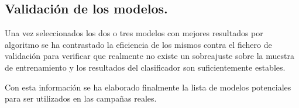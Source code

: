 \subsection{Validación de los modelos.}

Una vez seleccionados los dos o tres modelos con mejores resultados por algoritmo se ha contrastado la eficiencia de los mismos contra el fichero de validación para verificar que realmente no existe un sobreajuste sobre la muestra de entrenamiento y los resultados del clasificador son suficientemente estables. 

Con esta información se ha elaborado finalmente la lista de modelos potenciales para ser utilizados en las campañas reales.